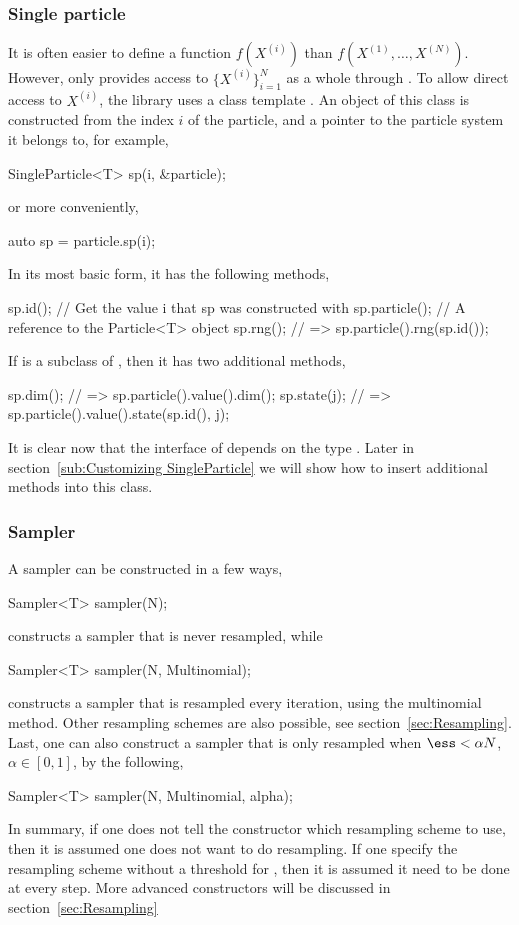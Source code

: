 \documentclass[11pt,bib,mint,hyper,altcolor]{marticle}
\begin{document}
\subsubsection{Single particle}
\label{ssub:Single particle}

It is often easier to define a function $f(X^{(i)})$ than
$f(X^{(1)},\dots,X^{(N)})$. However,  only provides
access to $\{X^{(i)}\}_{i=1}^N$ as a whole through
. To allow direct access to $X^{(i)}$, the library
uses a class template . An object of this class is
constructed from the index $i$ of the particle, and a pointer to the particle
system it belongs to, for example,
\begin{cppcode}
  SingleParticle<T> sp(i, &particle);
\end{cppcode}
or more conveniently,
\begin{cppcode}
  auto sp = particle.sp(i);
\end{cppcode}
In its most basic form, it has the following methods,
\begin{cppcode}
  sp.id();       // Get the value i that sp was constructed with
  sp.particle(); // A reference to the Particle<T> object
  sp.rng();      // => sp.particle().rng(sp.id());
\end{cppcode}
If  is a subclass of , then it has two
additional methods,
\begin{cppcode}
  sp.dim();    // => sp.particle().value().dim();
  sp.state(j); // => sp.particle().value().state(sp.id(), j);
\end{cppcode}
It is clear now that the interface of  depends on
the type . Later in section~\ref{sub:Customizing SingleParticle}
we will show how to insert additional methods into this class.

\subsubsection{Sampler}
\label{ssub:Sampler}

A sampler can be constructed in a few ways,
\begin{cppcode}
  Sampler<T> sampler(N);
\end{cppcode}
constructs a sampler that is never resampled, while
\begin{cppcode}
  Sampler<T> sampler(N, Multinomial);
\end{cppcode}
constructs a sampler that is resampled every iteration, using the multinomial
method. Other resampling schemes are also possible, see
section~\ref{sec:Resampling}. Last, one can also construct a sampler that is
only resampled when $\ess < \alpha N$, $\alpha\in[0, 1]$, by the following,
\begin{cppcode}
  Sampler<T> sampler(N, Multinomial, alpha);
\end{cppcode}
In summary, if one does not tell the constructor which resampling scheme to
use, then it is assumed one does not want to do resampling. If one specify the
resampling scheme without a threshold for \ess, then it is assumed it need to
be done at every step. More advanced constructors will be discussed in
section~\ref{sec:Resampling}
\end{document}
